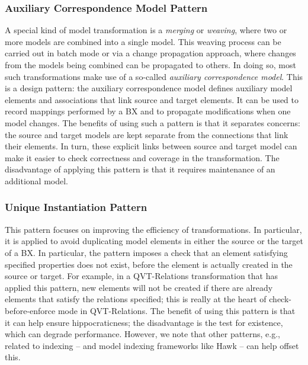 \subsubsection{Auxiliary Correspondence Model Pattern}
A special kind of model transformation is a \textit{merging} or \textit{weaving}, where two or more models are combined into a single model. This weaving process can be carried out in batch mode or via a change propagation approach, where changes from the models being combined can be propagated to others. In doing so, most such transformations make use of a so-called \textit{auxiliary correspondence model}. This is a design pattern: the auxiliary correspondence model defines auxiliary model elements and associations that link source and target elements. It can be used to record mappings performed by a BX and to propagate modifications when one model changes. The benefits of using such a pattern is that it separates concerns: the source and target models are kept separate from the connections that link their elements. In turn, these explicit links between source and target model can make it easier to check correctness and coverage in the transformation. The disadvantage of applying this pattern is that it requires maintenance of an additional model.

\subsubsection{Unique Instantiation Pattern}
This pattern focuses on improving the efficiency of transformations. In particular, it is applied to avoid duplicating model elements in either the source or the target of a BX. In particular, the pattern imposes a check that an element satisfying specified properties does not exist, before the element is actually created in the source or target. For example, in a QVT-Relations transformation that has applied this pattern, new elements will not be created if there are already elements that satisfy the relations specified; this is really at the heart of check-before-enforce mode in QVT-Relations. The benefit of using this pattern is that it can help ensure hippocraticness; the disadvantage is the test for existence, which can degrade performance. However, we note that other patterns, e.g., related to indexing \cite{LanoKR14} -- and model indexing frameworks like Hawk -- can help offset this.

